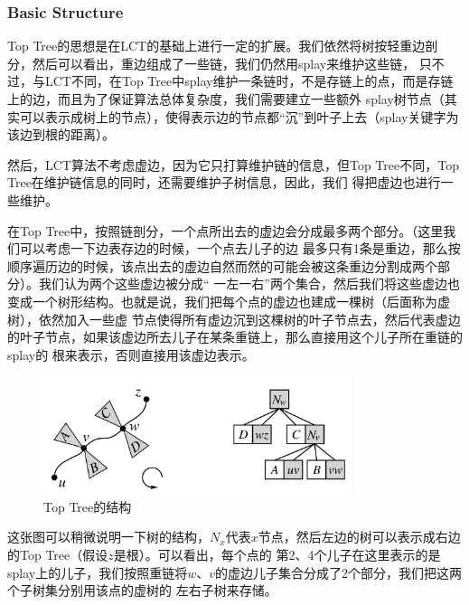 ﻿\documentclass{article}
\begin{document}
		\subsubsection{Basic Structure}
		\indent Top Tree的思想是在LCT的基础上进行一定的扩展。我们依然将树按轻重边剖分，然后可以看出，重边组成了一些链，我们仍然用splay来维护这些链，
		只不过，与LCT不同，在Top Tree中splay维护一条链时，不是存链上的点，而是存链上的边，而且为了保证算法总体复杂度，我们需要建立一些额外
		splay树节点（其实可以表示成树上的节点），使得表示边的节点都“沉”到叶子上去（splay关键字为该边到根的距离）。\par
		\indent 然后，LCT算法不考虑虚边，因为它只打算维护链的信息，但Top Tree不同，Top Tree在维护链信息的同时，还需要维护子树信息，因此，我们
		得把虚边也进行一些维护。\par
		\indent 在Top Tree中，按照链剖分，一个点所出去的虚边会分成最多两个部分。（这里我们可以考虑一下边表存边的时候，一个点去儿子的边
		最多只有1条是重边，那么按顺序遍历边的时候，该点出去的虚边自然而然的可能会被这条重边分割成两个部分）。我们认为两个这些虚边被分成“
		一左一右”两个集合，然后我们将这些虚边也变成一个树形结构。也就是说，我们把每个点的虚边也建成一棵树（后面称为虚树），依然加入一些虚
		节点使得所有虚边沉到这棵树的叶子节点去，然后代表虚边的叶子节点，如果该虚边所去儿子在某条重链上，那么直接用这个儿子所在重链的splay的
		根来表示，否则直接用该虚边表示。
		\begin{figure}[!htbp]
			\centering
			\includegraphics[width=9.0cm]{topTree.jpg}
			\caption{Top Tree的结构}
		\end{figure}
		\indent 这张图可以稍微说明一下树的结构，$N_x$代表$x$节点，然后左边的树可以表示成右边的Top Tree（假设$z$是根）。可以看出，每个点的
		第2、4个儿子在这里表示的是splay上的儿子，我们按照重链将$w$、$v$的虚边儿子集合分成了2个部分，我们把这两个子树集分别用该点的虚树的
		左右子树来存储。\par
\end{document}
